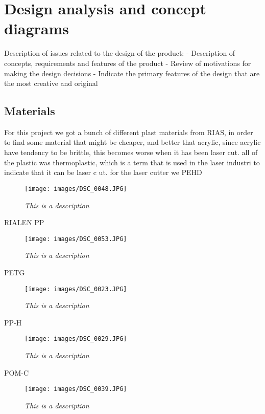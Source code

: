 \section{Design analysis and concept diagrams}
Description of issues related to the design of the product:
- Description of concepts, requirements and features of the product
- Review of motivations for making the design decisions
- Indicate the primary features of the design that are the most creative and original

\subsection{Materials}
For this project we got a bunch of different plast materials from RIAS, in order to find some material that might be cheaper, and better that acrylic, since acrylic have tendency to be brittle, this becomes worse when it has been laser cut.
all of the plastic was thermoplastic, which is a term that is used in the laser industri to indicate that it can be laser c ut.
for the laser cutter we 
PEHD
\begin{figure}[h]
	\begin{center}
		\texttt{[image: images/DSC\_0048.JPG]}
		\caption{\small {\it {This is a description}}} \label{fig:explode}
	\end{center}
\end{figure}

RIALEN PP
\begin{figure}[h]
	\begin{center}
		\texttt{[image: images/DSC\_0053.JPG]}
		\caption{\small {\it {This is a description}}} \label{fig:explode}
	\end{center}
\end{figure}
PETG
\begin{figure}[h]
	\begin{center}
		\texttt{[image: images/DSC\_0023.JPG]}
		\caption{\small {\it {This is a description}}} \label{fig:explode}
	\end{center}
\end{figure}
PP-H
\begin{figure}[h]
	\begin{center}
		\texttt{[image: images/DSC\_0029.JPG]}
		\caption{\small {\it {This is a description}}} \label{fig:explode}
	\end{center}
\end{figure}
POM-C
\begin{figure}[h]
	\begin{center}
		\texttt{[image: images/DSC\_0039.JPG]}
		\caption{\small {\it {This is a description}}} \label{fig:explode}
	\end{center}
\end{figure}

